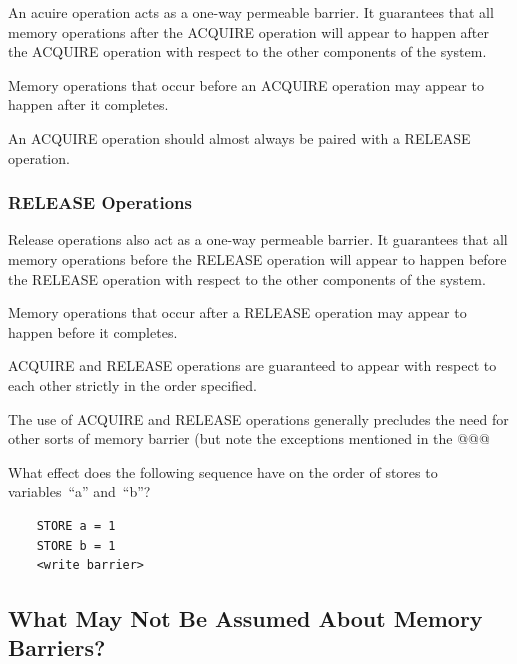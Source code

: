 An acuire operation acts as a one-way permeable barrier.
It guarantees that all memory
operations after the ACQUIRE operation will appear to happen after the ACQUIRE
operation with respect to the other components of the system.

Memory operations that occur before an ACQUIRE operation may appear to happen
after it completes.

An ACQUIRE operation should almost always be paired with a RELEASE operation.

\subsubsection{RELEASE Operations}

Release operations also act as a one-way permeable barrier.
It guarantees that all
memory operations before the RELEASE operation will appear to happen before
the RELEASE operation with respect to the other components of the system.

Memory operations that occur after a RELEASE operation may appear to
happen before it completes.

ACQUIRE and RELEASE operations are guaranteed to appear with respect to each
other strictly in the order specified.

The use of ACQUIRE and RELEASE operations generally precludes the need for
other sorts of memory barrier (but note the exceptions mentioned in the
@@@ %

\QuickQuiz{}
	What effect does the following sequence have on the
	order of stores to variables~``a'' and~``b''?

	\vspace{5pt}
	\begin{minipage}[t]{\columnwidth}
	\small
	\begin{verbatim}
	STORE a = 1
	STORE b = 1
	<write barrier>
	\end{verbatim}
	\end{minipage}
 \QuickQuizEnd

\subsection{What May Not Be Assumed About Memory Barriers?}
\label{sec:memorder:What May Not Be Assumed About Memory Barriers?}


